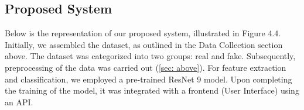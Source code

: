         \subsection{Proposed System}
        Below is the representation of our proposed system, illustrated in Figure 4.4. Initially, we assembled the dataset, as outlined in the Data Collection section above. The dataset was categorized into two groups: real and fake. Subsequently, preprocessing of the data was carried out (\ref{sec: above}). For feature extraction and classification, we employed a pre-trained ResNet 9 model. Upon completing the training of the model, it was integrated with a frontend (User Interface) using an API.
        \vspace{20pt}
        \begin{figure}[hbt!]
        \end{figure}

